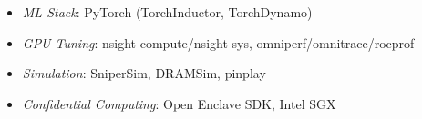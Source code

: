 \SubHeadingListStart
        \begin{itemize}
        \item[] \textit{ML Stack}: PyTorch (TorchInductor, TorchDynamo)
        \item[] \textit{GPU Tuning}: nsight-compute/nsight-sys, omniperf/omnitrace/rocprof
        \item[] \textit{Simulation}: SniperSim, DRAMSim, pinplay
        \item[] \textit{Confidential Computing}: Open Enclave SDK, Intel SGX
        \end{itemize}

\SubHeadingListEnd